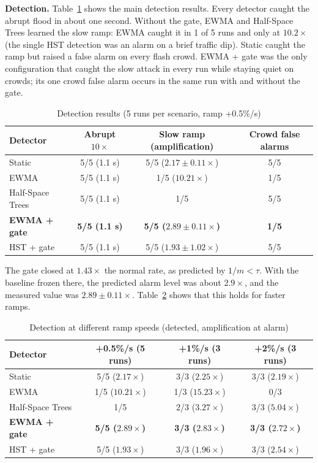 \documentclass[12pt,a4paper,oneside]{report}
\begin{document}
\textbf{Detection.} Table~\ref{tab:detection} shows the main detection results. Every detector caught the abrupt flood in about one second. Without the gate, EWMA and Half-Space Trees learned the slow ramp: EWMA caught it in 1 of 5 runs and only at $10.2\times$ (the single HST detection was an alarm on a brief traffic dip). Static caught the ramp but raised a false alarm on every flash crowd. EWMA + gate was the only configuration that caught the slow attack in every run while staying quiet on crowds; its one crowd false alarm occurs in the same run with and without the gate.
\begin{table}[htbp]\centering\caption{Detection results (5 runs per scenario, ramp +0.5\%/s)}\label{tab:detection}\begin{tabular}{lccc}\toprule Detector & Abrupt $10\times$ & Slow ramp (amplification) & Crowd false alarms\\\midrule
Static & 5/5 (1.1 s) & 5/5 ($2.17\pm0.11\times$) & 5/5\\
EWMA & 5/5 (1.1 s) & 1/5 ($10.21\times$) & 1/5\\
Half-Space Trees & 5/5 (1.1 s) & 1/5 & 5/5\\
\textbf{EWMA + gate} & \textbf{5/5 (1.1 s)} & \textbf{5/5 ($2.89\pm0.11\times$)} & \textbf{1/5}\\
HST + gate & 5/5 (1.1 s) & 5/5 ($1.93\pm1.02\times$) & 5/5\\\bottomrule\end{tabular}\end{table}

The gate closed at $1.43\times$ the normal rate, as predicted by $1/m < \tau$. With the baseline frozen there, the predicted alarm level was about $2.9\times$, and the measured value was $2.89\pm0.11\times$. Table~\ref{tab:growth} shows that this holds for faster ramps.
\begin{table}[htbp]\centering\caption{Detection at different ramp speeds (detected, amplification at alarm)}\label{tab:growth}\begin{tabular}{lccc}\toprule Detector & +0.5\%/s (5 runs) & +1\%/s (3 runs) & +2\%/s (3 runs)\\\midrule
Static & 5/5 ($2.17\times$) & 3/3 ($2.25\times$) & 3/3 ($2.19\times$)\\
EWMA & 1/5 ($10.21\times$) & 1/3 ($15.23\times$) & 0/3\\
Half-Space Trees & 1/5 & 2/3 ($3.27\times$) & 3/3 ($5.04\times$)\\
\textbf{EWMA + gate} & \textbf{5/5 ($2.89\times$)} & \textbf{3/3 ($2.83\times$)} & \textbf{3/3 ($2.72\times$)}\\
HST + gate & 5/5 ($1.93\times$) & 3/3 ($1.96\times$) & 3/3 ($2.54\times$)\\\bottomrule\end{tabular}\end{table}
\end{document}
